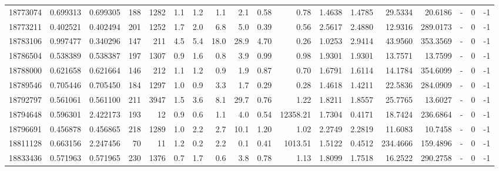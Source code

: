\begin{tabular}{rrrrrrrrrrrrrrrlrr}
  18773074 & 0.699313 &   0.699305 &  188 & 1282 &      1.1 &      1.2 &     1.1 &      2.1 &       0.58 &        0.78 &  1.4638 &  1.4785 &   29.5334 &   20.6186 &             - &        0 &         -1 \\
  18773211 & 0.402521 &   0.402494 &  201 & 1252 &      1.7 &      2.0 &     6.8 &      5.0 &       0.39 &        0.56 &  2.5617 &  2.4880 &   12.9316 &  289.0173 &             - &        0 &         -1 \\
  18783106 & 0.997477 &   0.340296 &  147 &  211 &      4.5 &      5.4 &    18.0 &     28.9 &       4.70 &        0.26 &  1.0253 &  2.9414 &   43.9560 &  353.3569 &             - &        0 &         -1 \\
  18786504 & 0.538389 &   0.538387 &  197 & 1307 &      0.9 &      1.6 &     0.8 &      3.9 &       0.99 &        0.98 &  1.9301 &  1.9301 &   13.7571 &   13.7599 &             - &        0 &         -1 \\
  18788000 & 0.621658 &   0.621664 &  146 &  212 &      1.1 &      1.2 &     0.9 &      1.9 &       0.87 &        0.70 &  1.6791 &  1.6114 &   14.1784 &  354.6099 &             - &        0 &         -1 \\
  18789546 & 0.705446 &   0.705450 &  184 & 1297 &      1.0 &      0.9 &     3.3 &      1.7 &       0.29 &        0.28 &  1.4618 &  1.4211 &   22.5836 &  284.0909 &             - &        0 &         -1 \\
  18792797 & 0.561061 &   0.561100 &  211 & 3947 &      1.5 &      3.6 &     8.1 &     29.7 &       0.76 &        1.22 &  1.8211 &  1.8557 &   25.7765 &   13.6027 &             - &        0 &         -1 \\
  18794648 & 0.596301 &   2.422173 &  193 &   12 &      0.9 &      0.6 &     1.1 &      4.0 &       0.54 &    12358.21 &  1.7304 &  0.4171 &   18.7424 &  236.6864 &             - &        0 &         -1 \\
  18796691 & 0.456878 &   0.456865 &  218 & 1289 &      1.0 &      2.2 &     2.7 &     10.1 &       1.20 &        1.02 &  2.2749 &  2.2819 &   11.6083 &   10.7458 &             - &        0 &         -1 \\
  18811128 & 0.663156 &   2.247456 &   70 &   11 &      1.2 &      0.2 &     2.2 &      0.1 &       0.41 &     1013.51 &  1.5122 &  0.4512 &  234.4666 &  159.4896 &             - &        0 &         -1 \\
  18833436 & 0.571963 &   0.571965 &  230 & 1376 &      0.7 &      1.7 &     0.6 &      3.8 &       0.78 &        1.13 &  1.8099 &  1.7518 &   16.2522 &  290.2758 &             - &        0 &         -1 \\

\end{tabular}
